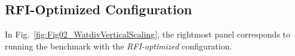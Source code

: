 \documentclass[twocolumn]{bmcart}%
\def\texttt{[image: ]}
\begin{document}


\subsection{RFI-Optimized Configuration}
\label{subsec:rfi}
%

%


In Fig.~\ref{fig:Fig02_WatdivVerticalScaling}, the rightmost panel corresponds to running the benchmark with the \emph{RFI-optimized} configuration.
\end{document}
